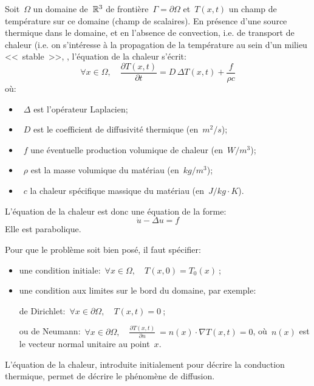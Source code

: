 \medskip
Soit~$\Omega$ un domaine de~$\mathbb R^3$ de frontière~$\Gamma=\partial \Omega$ et~$T(x,t)$ 
un champ de température sur ce domaine (champ de scalaires). 
En présence d'une source thermique dans le domaine, et en l'absence de convection, i.e.
de transport de chaleur (i.e. on s'intéresse à la propagation de la température au sein d'un 
milieu <<~stable~>>, , 
l'équation de la chaleur s'écrit:
\begin{equation}
\forall x \in\Omega, \quad \frac{\partial T (x,t)}{\partial t} = D \, \Delta T(x,t) + \frac{f}{\rho c}
\end{equation}
où:
\begin{itemize}
  \item~$\Delta$ est l'opérateur Laplacien;
  \item~$D$ est le coefficient de diffusivité thermique (en~$m^2/s$);
  \item~$f$ une éventuelle production volumique de chaleur (en~$W/m^3$);
  \item~$\rho$ est la masse volumique du matériau (en~$kg/m^3$);
  \item~$c$ la chaleur spécifique massique du matériau (en~$J/kg·K$).
\end{itemize}

\medskip{}
L'équation de la chaleur est donc une équation de la forme:
\begin{equation}
\dot{u}-\Delta u=f
\end{equation}
Elle est parabolique.

\medskip
Pour que le problème soit bien posé, il faut spécifier:
\begin{itemize}
  \item une condition initiale:~$\forall x\in\Omega, \quad T (x,0) = T_0(x)~$;
  \item une condition aux limites sur le bord du domaine, par exemple:

    de Dirichlet:~$\forall x\in\partial \Omega, \quad T (x,t) = 0~$;

    ou de Neumann:~$\forall x\in\partial \Omega, \quad \frac{\partial T (x,t)}{\partial n} \ 
	= n(x) \cdot \nabla T(x,t) = 0$, où~$n(x)$ est le vecteur normal unitaire au point~$x$.
\end{itemize}

\medskip
L'équation de la chaleur, introduite initialement pour décrire la conduction thermique, permet
de décrire le phénomène de diffusion.

